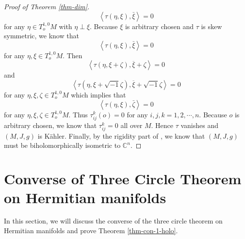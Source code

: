 \documentclass[12pt]{amsart}
\def\ol{\overline}
\newcommand\C{{\mathbb C}}
\def\ol{\overline}
\def\ii{{\sqrt{-1}}}
\def\vv<#1,#2>{\left\langle#1,#2\right\rangle}
\theoremstyle{definition}
\theoremstyle{remark}
\numberwithin{equation}{section}
\begin{document}
\begin{proof}[Proof of Theorem \ref{thm-dim}]
\begin{equation}
\vv<\tau(\eta,\xi),\bar\xi>=0
\end{equation}
for any $\eta\in T_{o}^{1,0}M$ with $\eta\perp\xi$. Because $\xi$ is arbitrary chosen and $\tau$ is skew symmetric, we know that
\begin{equation}
\vv<\tau(\eta,\xi),\bar \xi>=0
\end{equation}
for any $\eta,\xi\in T_{o}^{1,0}M$. Then
\begin{equation}
\vv<\tau(\eta,\xi+\zeta), \ol{\xi+\zeta}>=0
\end{equation}
and
\begin{equation}
\vv<\tau(\eta,\xi+\ii\zeta), \ol{\xi+\ii\zeta}>=0
\end{equation}
for any $\eta,\xi,\zeta\in T_o^{1,0}M$ which implies that
$$\vv<\tau(\eta,\xi),\bar\zeta>=0$$
for any $\eta,\xi,\zeta\in T_o^{1,0}M$. Thus $\tau_{ij}^k(o)=0$ for any $i,j,k=1,2,\cdots,n$. Because $o$ is arbitrary chosen, we know that $\tau_{ij}^k=0$ all over $M$. Hence $\tau$ vanishes and $(M,J,g)$ is K\"ahler. Finally, by the rigidity part of \cite[Theorem 4]{Liu}, we know that $(M,J,g)$ must be biholomorphically isometric to $\C^n$.
\end{proof}

\section{Converse of Three Circle Theorem on Hermitian manifolds}
In this section, we will discuss the converse of the three circle theorem on Hermitian manifolds and prove Theorem \ref{thm-con-1-holo}.
\end{document}
